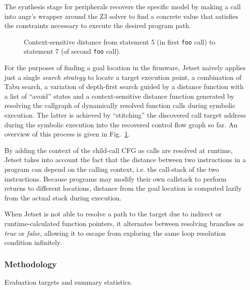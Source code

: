The synthesis stage for peripherals recovers the specific model by making a call into angr's wrapper around the Z3 solver to find a concrete value that satisfies the constraints necessary to execute the desired program path.

\begin{figure}
\centering

\caption{Context-sensitive distance from statement 5 (in first \texttt{foo} call) to statement 7 (of second \texttt{foo} call).}
\label{fig:distance_func}
\end{figure}

For the purposes of finding a goal location in the firmware, Jetset naively applies just a single \emph{search strategy} to locate a target execution point, a combination of Tabu search, a variation of depth-first search guided by a distance function with a list of ``avoid'' states and a context-sensitive distance function generated by resolving the callgraph of dynamically resolved function calls during symbolic execution.
The latter is achieved by ``stitching'' the discovered call target address during the symbolic execution into the recovered control flow graph so far.
An overview of this process is given in Fig.~\ref{fig:distance_func}.

By adding the context of the child-call CFG as calls are resolved at runtime, Jetset takes into account the fact that the distance between two instructions in a program can depend on the calling context, i.e. the call-stack of the two instructions.
Because programs may modify their own callstack to perform returns to different locations, distance from the goal location is computed lazily from the actual stack during execution.

When Jetset is not able to resolve a path to the target due to indirect or runtime-calculated function pointers, it alternates between resolving branches as \emph{true} or \emph{false}, allowing it to escape from exploring the same loop resolution condition infinitely.

\subsubsection{Methodology}



\begin{table}
\small
\centering
\caption{Evaluation targets and summary statistics.}
\label{tab:targets}

\vspace{\baselineskip} %
\end{table}

